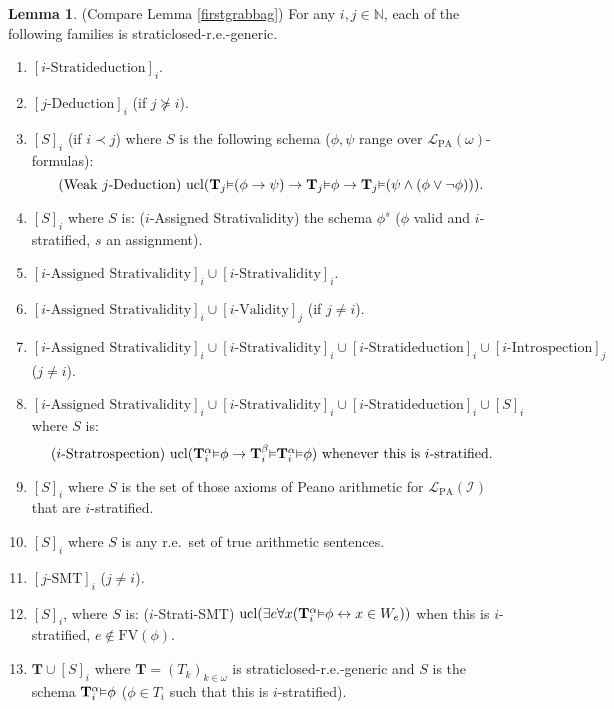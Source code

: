 \documentclass[reqno]{article}
\theoremstyle{definition}
\newtheorem{lemma}[theorem]{Lemma}
\def\N{\mathbb{N}}
\def\L{\mathscr{L}}
\def\T{\mathbf{T}}
\def\FV{\mathrm{FV}}
\def\LPA{\L_{\mathrm{PA}}}
\def\indset{\mathcal I}
\renewcommand{\Pr}[1]{\T_{#1}\mbox{\small${\vDash}$}}
\newcommand{\Prr}[2]{\T^{#1}_{#2}\mbox{\small${\vDash}$}}
\newcommand{\ucl}[1]{\mathrm{ucl}(#1)}
\begin{document}
\begin{lemma}
\label{secondgrabbag}
(Compare Lemma \ref{firstgrabbag})
For any $i,j\in\N$, each of the following families
is straticlosed-r.e.-generic.
\begin{enumerate}
\item $[\mbox{$i$-Stratideduction}]_i$.
\item $[\mbox{$j$-Deduction}]_i$ (if $j\not\succeq i$).
\item $[S]_i$ (if $i\prec j$) where $S$ is the following schema ($\phi,\psi$
    range over $\LPA(\omega)$-formulas):
\[
  \mbox{
    (Weak $j$-Deduction) $\ucl{\Pr j(\phi\rightarrow\psi)\rightarrow\Pr j\phi\rightarrow \Pr 
    j(\psi\wedge(\phi\vee\neg\phi))}$.
  }
\]
\item $[S]_i$ where $S$ is: ($i$-Assigned Strativalidity)
the schema $\phi^s$ ($\phi$ valid and $i$-stratified, $s$ an assignment).
\item $[\mbox{$i$-Assigned Strativalidity}]_i \cup [\mbox{$i$-Strativalidity}]_i$.
\item $[\mbox{$i$-Assigned Strativalidity}]_i \cup
[\mbox{$i$-Validity}]_j$ (if $j\not=i$).
\item $[\mbox{$i$-Assigned Strativalidity}]_i \cup [\mbox{$i$-Strativalidity}]_i \cup [\mbox{$i$-Stratideduction}]_i
\cup [\mbox{$i$-Introspection}]_j$ ($j\not=i$).
\item $[\mbox{$i$-Assigned Strativalidity}]_i \cup [\mbox{$i$-Strativalidity}]_i \cup [\mbox{$i$-Stratideduction}]_i
\cup [S]_i$ where $S$ is:
\[\mbox{($i$-Stratrospection) $\ucl{\Prr\alpha i\phi\rightarrow \Prr\beta 
i\Prr\alpha i\phi}$
whenever this is $i$-stratified.}\]
\item $[S]_i$ where $S$ is the set of those axioms of Peano arithmetic for 
$\LPA(\indset)$ that are $i$-stratified.
\item $[S]_i$ where $S$ is any r.e.~set of true arithmetic sentences.
\item $[\mbox{$j$-SMT}]_i$ ($j\not=i$).
\item $[S]_i$, where $S$ is: ($i$-Strati-SMT)
$\ucl{\exists e\forall x(\Prr\alpha i\phi\leftrightarrow x\in W_e)}$
when this is $i$-stratified, $e\not\in\FV(\phi)$.
\item $\T\cup [S]_i$ where $\T=(T_k)_{k\in\omega}$ is straticlosed-r.e.-generic
and $S$ is the schema $\Prr\alpha i\phi$ ($\phi\in T_i$ such that this is $i$-stratified).
\end{enumerate}
\end{lemma}
\end{document}
